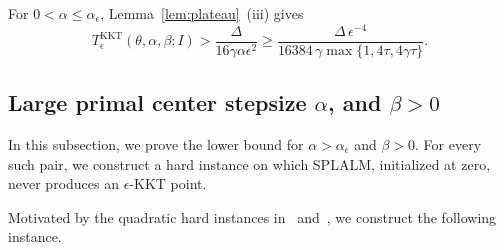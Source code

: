 For \(0<\alpha\le\alpha_\epsilon\), Lemma~\ref{lem:plateau}~(iii) gives
\[
T^{\mathrm{KKT}}_\epsilon(\theta,\alpha,\beta;I)
>\frac{\Delta}{16\gamma\alpha\epsilon^2}
\ge\frac{\Delta\,\epsilon^{-4}}{16384\,\gamma\max\{1,4\tau,4\gamma\tau\}}.
\]

\subsection{Large primal center stepsize \texorpdfstring{$\alpha$}{alpha}, and \texorpdfstring{$\beta>0$}{beta>0}}
\label{subsec:lb-rotation}

In this subsection, we prove the lower bound for
\(\alpha>\alpha_\epsilon\) and \(\beta>0\). For every such pair, we construct
a hard instance on which SPLALM, initialized at zero, never produces an
\(\epsilon\)-KKT point.


Motivated by the quadratic hard instances in~\cite[Example~5.1]{li2026smoothing}
and~\cite[Appendix~C.1]{mahdavinia2022tight}, we construct the following instance.

